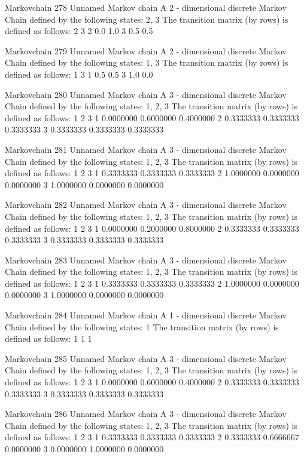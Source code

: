 \documentclass[
  nojss]{jss}
\begin{document}
\begin{CodeChunk}
\begin{CodeOutput}
Markovchain  278 
Unnamed Markov chain 
 A  2 - dimensional discrete Markov Chain defined by the following states: 
 2, 3 
 The transition matrix  (by rows)  is defined as follows: 
    2   3
2 0.0 1.0
3 0.5 0.5

Markovchain  279 
Unnamed Markov chain 
 A  2 - dimensional discrete Markov Chain defined by the following states: 
 1, 3 
 The transition matrix  (by rows)  is defined as follows: 
    1   3
1 0.5 0.5
3 1.0 0.0

Markovchain  280 
Unnamed Markov chain 
 A  3 - dimensional discrete Markov Chain defined by the following states: 
 1, 2, 3 
 The transition matrix  (by rows)  is defined as follows: 
          1         2         3
1 0.0000000 0.6000000 0.4000000
2 0.3333333 0.3333333 0.3333333
3 0.3333333 0.3333333 0.3333333

Markovchain  281 
Unnamed Markov chain 
 A  3 - dimensional discrete Markov Chain defined by the following states: 
 1, 2, 3 
 The transition matrix  (by rows)  is defined as follows: 
          1         2         3
1 0.3333333 0.3333333 0.3333333
2 1.0000000 0.0000000 0.0000000
3 1.0000000 0.0000000 0.0000000

Markovchain  282 
Unnamed Markov chain 
 A  3 - dimensional discrete Markov Chain defined by the following states: 
 1, 2, 3 
 The transition matrix  (by rows)  is defined as follows: 
          1         2         3
1 0.0000000 0.2000000 0.8000000
2 0.3333333 0.3333333 0.3333333
3 0.3333333 0.3333333 0.3333333

Markovchain  283 
Unnamed Markov chain 
 A  3 - dimensional discrete Markov Chain defined by the following states: 
 1, 2, 3 
 The transition matrix  (by rows)  is defined as follows: 
          1         2         3
1 0.3333333 0.3333333 0.3333333
2 1.0000000 0.0000000 0.0000000
3 1.0000000 0.0000000 0.0000000

Markovchain  284 
Unnamed Markov chain 
 A  1 - dimensional discrete Markov Chain defined by the following states: 
 1 
 The transition matrix  (by rows)  is defined as follows: 
  1
1 1

Markovchain  285 
Unnamed Markov chain 
 A  3 - dimensional discrete Markov Chain defined by the following states: 
 1, 2, 3 
 The transition matrix  (by rows)  is defined as follows: 
          1         2         3
1 0.0000000 0.6000000 0.4000000
2 0.3333333 0.3333333 0.3333333
3 0.3333333 0.3333333 0.3333333

Markovchain  286 
Unnamed Markov chain 
 A  3 - dimensional discrete Markov Chain defined by the following states: 
 1, 2, 3 
 The transition matrix  (by rows)  is defined as follows: 
          1         2         3
1 0.3333333 0.3333333 0.3333333
2 0.3333333 0.6666667 0.0000000
3 0.0000000 1.0000000 0.0000000


\end{CodeOutput}
\end{CodeChunk}
\end{document}
